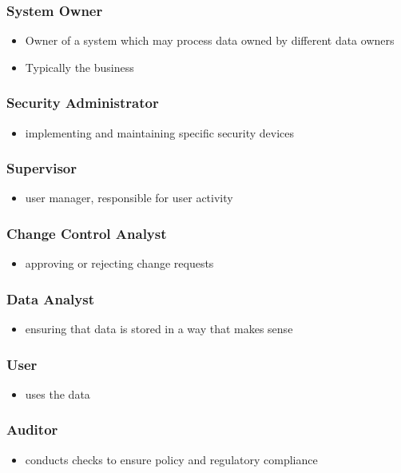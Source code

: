 \documentclass[11pt]{article}
\begin{document}
\subsubsection{System Owner}
\label{sec:org337cff9}
\begin{itemize}
\item Owner of a system which may process data owned by different data owners
\item Typically the business
\end{itemize}
\subsubsection{Security Administrator}
\label{sec:orgd1f2ebf}
\begin{itemize}
\item implementing and maintaining specific security devices
\end{itemize}
\subsubsection{Supervisor}
\label{sec:org2469a35}
\begin{itemize}
\item user manager, responsible for user activity
\end{itemize}
\subsubsection{Change Control Analyst}
\label{sec:orgd0d2eda}
\begin{itemize}
\item approving or rejecting change requests
\end{itemize}
\subsubsection{Data Analyst}
\label{sec:org010727b}
\begin{itemize}
\item ensuring that data is stored in a way that makes sense
\end{itemize}
\subsubsection{User}
\label{sec:org2f29dd8}
\begin{itemize}
\item uses the data
\end{itemize}
\subsubsection{Auditor}
\label{sec:org8d897aa}
\begin{itemize}
\item conducts checks to ensure policy and regulatory compliance
\end{itemize}
\end{document}
